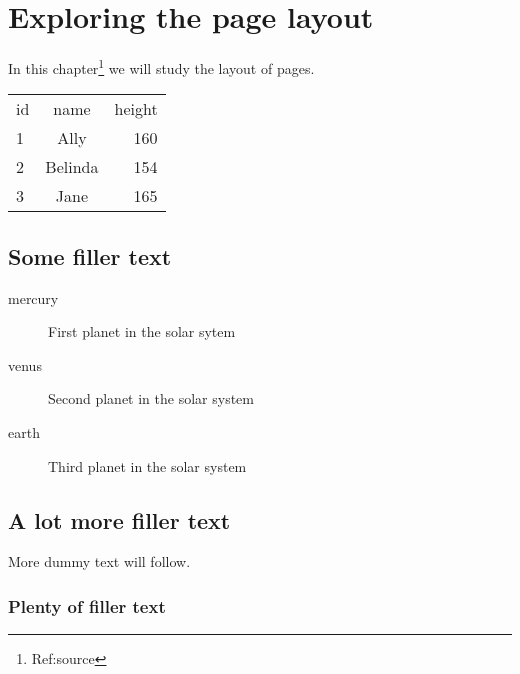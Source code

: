 \documentclass[a4paper,12pt]{book}
\begin{document}
\tableofcontents
\chapter{Exploring the page layout}
In this chapter\footnote{Ref:source} we will study the layout of pages.

\begin{tabular}{lcr}
id &  name & height \\
1 & Ally & 160 \\
2 & Belinda &154 \\
3 & Jane & 165\\
\end{tabular}

\section{Some filler text}
\begin{description}
	\item[mercury] First planet in the solar sytem
	\item[venus] Second planet in the solar system
	\item[earth] Third planet in the solar system
\end{description}
\blindtext
\section{A lot more filler text}
More dummy text will follow.

\subsection{Plenty of filler text}
\blindtext[10]
\end{document}
